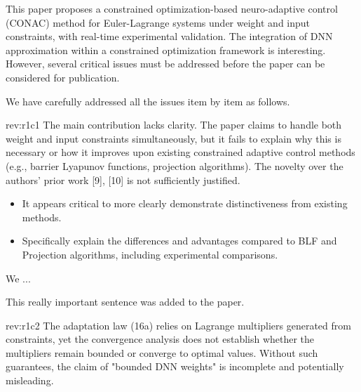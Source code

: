 \documentclass[12pt,english]{reviewresponse}
\begin{document}
\reviewer
\begin{generalcomment}
    This paper proposes a constrained optimization-based neuro-adaptive control (CONAC) method for Euler-Lagrange systems under weight and input constraints, with real-time experimental validation. The integration of DNN approximation within a constrained optimization framework is interesting. However, several critical issues must be addressed before the paper can be considered for publication.
\end{generalcomment}
\begin{revresponse}
    We have carefully addressed all the issues item by item as follows.
\end{revresponse}

\begin{revcomment}[1]{rev:r1c1}
    The main contribution lacks clarity. The paper claims to handle both weight and input constraints simultaneously, but it fails to explain why this is necessary or how it improves upon existing constrained adaptive control methods (e.g., barrier Lyapunov functions, projection algorithms). The novelty over the authors’ prior work [9], [10] is not sufficiently justified.
\end{revcomment}

\begin{howtoanswer}
    \begin{itemize}
        \item It appears critical to more clearly demonstrate distinctiveness from existing methods.
        \item Specifically explain the differences and advantages compared to BLF and Projection algorithms, including experimental comparisons.
    \end{itemize}
\end{howtoanswer}

\begin{revresponse}
    We ...
    \begin{changes}
        This really important sentence was added to the paper.
    \end{changes}
\end{revresponse}

\begin{revcomment}[1]{rev:r1c2}
    The adaptation law (16a) relies on Lagrange multipliers generated from constraints, yet the convergence analysis does not establish whether the multipliers remain bounded or converge to optimal values. Without such guarantees, the claim of "bounded DNN weights" is incomplete and potentially misleading.
\end{revcomment}
\end{document}
